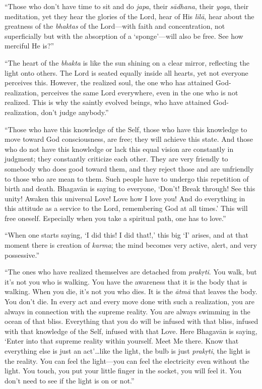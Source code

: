 \documentclass[12pt, twoside, openright]{memoir}
\begin{document}
\enquote{Those who don’t have time to sit and do \textit{japa}, their \textit{sādhana}, their \textit{yoga}, their meditation, yet they hear the glories of the Lord, hear of His \textit{līlā}, hear about the greatness of the \textit{bhaktas} of the Lord---with faith and concentration, not superficially but with the absorption of a \enquote{sponge}---will also be free. See how merciful He is?}

\enquote{The heart of the \textit{bhakta} is like the sun shining on a clear mirror, reflecting the light onto others. The Lord is seated equally inside all hearts, yet not everyone perceives this. However, the realized soul, the one who has attained God-realization, perceives the same Lord everywhere, even in the one who is not realized. This is why the saintly evolved beings, who have attained God-realization, don’t judge anybody.}

\enquote{Those who have this knowledge of the Self, those who have this knowledge to move toward God consciousness, are free; they will achieve this state. And those who do not have this knowledge or lack this equal vision are constantly in judgment; they constantly criticize each other. They are very friendly to somebody who does good toward them, and they reject those and are unfriendly to those who are mean to them. Such people have to undergo this repetition of birth and death. Bhagavān is saying to everyone, \enquote{Don’t! Break through! See this unity! Awaken this universal Love! Love how I love you! And do everything in this attitude as a service to the Lord, remembering God at all times.} This will free oneself. Especially when you take a spiritual path, one has to love.}

\enquote{When one starts saying, \enquote{I did this! I did that!,} this big \enquote{I} arises, and at that moment there is creation of \textit{karma}; the mind becomes very active, alert, and very possessive.}

\enquote{The ones who have realized themselves are detached from \textit{prakṛti}. You walk, but it’s not you who is walking. You have the awareness that it is the body that is walking. When you die, it’s not you who dies. It is the \textit{ātmā} that leaves the body. You don’t die. In every act and every move done with such a realization, you are always in connection with the supreme reality. You are always swimming in the ocean of that bliss. Everything that you do will be infused with that bliss, infused with that knowledge of the Self, infused with that Love. Here Bhagavān is saying, \enquote{Enter into that supreme reality within yourself. Meet Me there. Know that everything else is just an act}\ldots like the light, the bulb is just \textit{prakṛti}, the light is the reality. You can feel the light---you can feel the electricity even without the light. You touch, you put your little finger in the socket, you will feel it. You don’t need to see if the light is on or not.}
\end{document}
